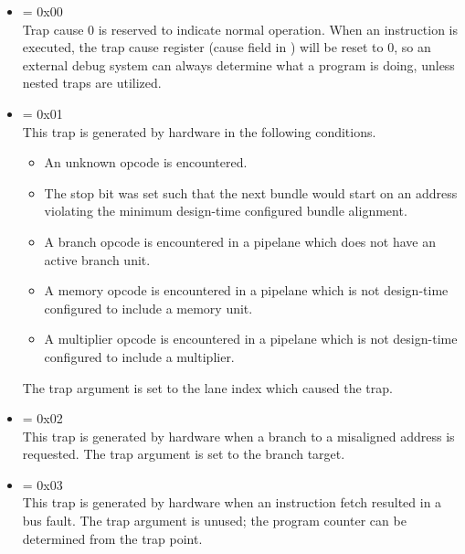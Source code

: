 \begin{itemize}
\setcounter{enumi}{-1}
\item {} \label{trap:NONE}  = 0x00
\\[6 pt]
Trap cause 0 is reserved to indicate normal operation. When an 
 instruction is executed, the trap cause register (cause field in 
) will be reset to 0, so an external debug system can always determine 
what a program is doing, unless nested traps are utilized.

\setcounter{enumi}{0}
\item {} \label{trap:INVALID_OP}  = 0x01
\\[6 pt]
This trap is generated by hardware in the following conditions.

\begin{itemize}

\item An unknown opcode is encountered.

\item The stop bit was set such that the next bundle would start on an address
violating the minimum design-time configured bundle alignment.

\item A branch opcode is encountered in a pipelane which does not have an active
branch unit.

\item A memory opcode is encountered in a pipelane which is not design-time
configured to include a memory unit.

\item A multiplier opcode is encountered in a pipelane which is not design-time
configured to include a multiplier.

\end{itemize}

\noindent The trap argument is set to the lane index which caused the trap.

\setcounter{enumi}{1}
\item {} \label{trap:MISALIGNED_BRANCH}  = 0x02
\\[6 pt]
This trap is generated by hardware when a branch to a misaligned address is
requested. The trap argument is set to the branch target.

\setcounter{enumi}{2}
\item {} \label{trap:FETCH_FAULT}  = 0x03
\\[6 pt]
This trap is generated by hardware when an instruction fetch resulted in a bus
fault. The trap argument is unused; the program counter can be determined from
the trap point.


\end{itemize}
